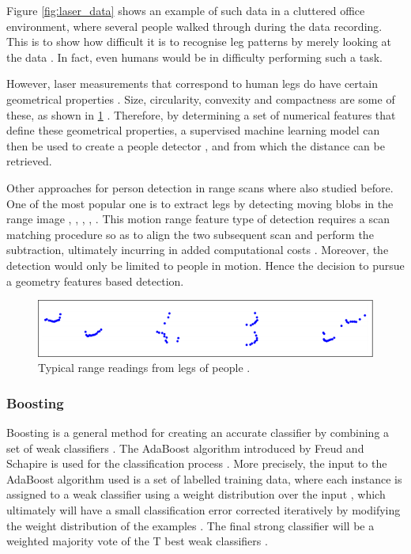 Figure \ref{figːlaser_data} shows an example of such data in a cluttered office environment, where several people walked through during the data recording. This is to show how difficult it is to recognise leg patterns by merely looking at the data \cite{arras2007using}. In fact, even humans would be in difficulty performing such a task.

However, laser measurements that correspond to human legs do have certain geometrical properties \cite{arras2007using}. Size, circularity, convexity and compactness are some of these, as shown in \ref{figːleg_scans} \cite{arras2007using}. Therefore, by determining a set of numerical features that define these geometrical properties, a supervised machine learning model can then be used to create a people detector \cite{arras2007using}, and from which the distance can be retrieved.

Other approaches for person detection in range scans where also studied before. One of the most popular one is to extract legs by detecting moving blobs in the range image \cite{fod2002laser}, \cite{kleinehagenbrock2002person}, \cite{scheutz2004fast}, \cite{schulz2003people}, \cite{arras2007using}. This motion range feature type of detection requires a scan matching procedure so as to align the two subsequent scan and perform the subtraction, ultimately incurring in added computational costs \cite{arras2007using}. Moreover, the detection would only be limited to people in motion. Hence the decision to pursue a geometry features based detection.

\begin{figure}[H]
\begin{center}
\includegraphics[width=.4\linewidth]{images/leg_scans.png}
\end{center}
\caption{Typical range readings from legs of people \cite{arras2007using}.}
\label{figːleg_scans}
\end{figure}


\subsubsection{Boosting}

Boosting is a general method for creating an accurate classifier by combining a set of weak classifiers \cite{arras2007using}. The AdaBoost algorithm introduced by Freud and Schapire \cite{schapire1999improved} is used for the classification process \cite{arras2007using}. More precisely, the input to the AdaBoost algorithm used is a set of labelled training data, where each instance is assigned to a weak classifier using a weight distribution over the input \cite{arras2007using}, which ultimately will have a small classification error corrected iteratively by modifying the weight distribution of the examples \cite{arras2007using}. The final strong classifier will be a weighted majority vote of the T best weak classifiers \cite{arras2007using}.

